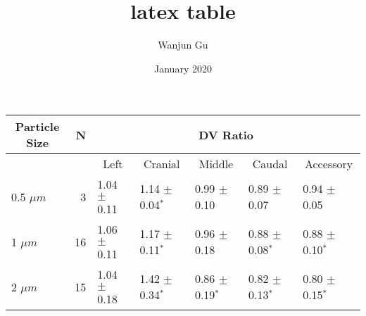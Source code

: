 \documentclass{article}
\title{latex table}
\author{Wanjun Gu}
\date{January 2020}
\begin{document}
\begin{table}[]
\begin{tabular}{lrlllll}
\hline
\multicolumn{1}{c}{Particle Size} & N  & \multicolumn{5}{c}{DV Ratio}                                                                                                                     \\ \hline
\multicolumn{1}{c}{}              &    & \multicolumn{1}{c}{Left} & \multicolumn{1}{c}{Cranial} & \multicolumn{1}{c}{Middle} & \multicolumn{1}{c}{Caudal} & \multicolumn{1}{c}{Accessory} \\ \cline{3-7} 
0.5 $\mu m$                       & 3  & 1.04 $\pm$ 0.11          & 1.14 $\pm$ 0.04$^\ast$      & 0.99 $\pm$ 0.10            & 0.89 $\pm$ 0.07            & 0.94 $\pm$ 0.05               \\
1 $\mu m$                         & 16 & 1.06 $\pm$ 0.11          & 1.17 $\pm$ 0.11$^\ast$      & 0.96 $\pm$ 0.18            & 0.88 $\pm$ 0.08$^\ast$     & 0.88 $\pm$ 0.10$^\ast$        \\
2 $\mu m$                         & 15 & 1.04 $\pm$ 0.18          & 1.42 $\pm$ 0.34$^\ast$      & 0.86 $\pm$ 0.19$^\ast$     & 0.82 $\pm$ 0.13$^\ast$     & 0.80 $\pm$ 0.15$^\ast$        \\ \hline
\end{tabular}
\end{table}
\end{document}
